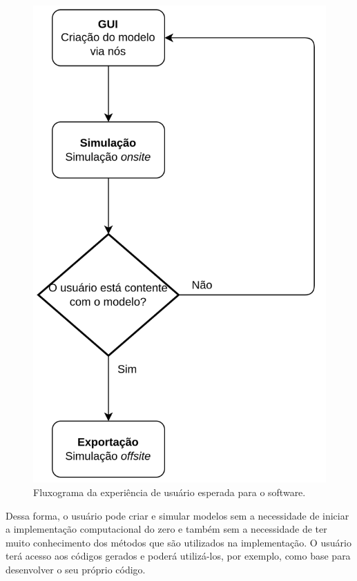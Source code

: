 \documentclass[
	12pt,				%
	openright,			%
	oneside,			%
	a4paper,			%
	main=brazil,
	english,			%
	]{ufsj-abntex2}
\begin{document}
\begin{figure}[h]
    \centering
    \includegraphics[scale=0.25]{imgs/fluxograma.png} 
    \caption{Fluxograma da experiência de usuário esperada para o software.}
    \label{fig::experiencia_usuario}
\end{figure}

Dessa forma, o usuário pode criar e simular modelos sem a necessidade de iniciar a implementação computacional do zero e também sem a necessidade de ter muito conhecimento dos métodos que são utilizados na implementação. O usuário terá acesso aos códigos gerados e poderá utilizá-los, por exemplo, como base para desenvolver o seu próprio código. 
\end{document}
